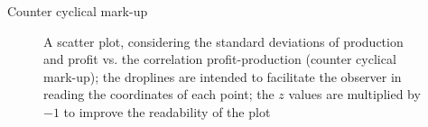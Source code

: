 \documentclass[9pt]{beamer}
\begin{document}
\begin{frame}{Counter cyclical mark-up}

\begin{figure}[H]
\begin{center}
\end{center}
\caption{A scatter plot, considering the standard deviations of production and profit vs. the correlation profit-production (counter cyclical mark-up); the droplines are intended to facilitate the observer in reading the coordinates of each point; the $z$ values are multiplied by $-1$ to improve the readability of the plot}
\label{scatter3D}
\end{figure}


\end{frame}
\end{document}
